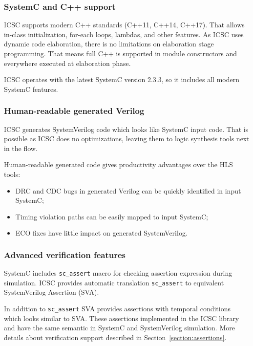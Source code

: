 \subsubsection{SystemC and C++ support}

ICSC supports modern C++ standards (C++11, C++14, C++17). That allows in-class initialization, for-each loops, lambdas, and other features.
As ICSC uses dynamic code elaboration, there is no limitations on elaboration stage programming. That means full C++ is supported in module constructors and everywhere executed at elaboration phase.

ICSC operates with the latest SystemC version 2.3.3, so it includes all modern SystemC features. 

\subsubsection{Human-readable generated Verilog}

ICSC generates SystemVerilog code which looks like SystemC input code. That is possible as ICSC does no optimizations, leaving them to logic synthesis tools next in the flow.

Human-readable generated code gives productivity advantages over the HLS tools:
\begin{itemize}
\item DRC and CDC bugs in generated Verilog can be quickly identified in input SystemC;
\item Timing violation paths can be easily mapped to input SystemC;
\item ECO fixes have little impact on generated SystemVerilog.
\end{itemize}

\subsubsection{Advanced verification features}

SystemC includes {\tt sc\_assert} macro for checking assertion expression during simulation. ICSC provides automatic translation {\tt sc\_assert} to equivalent SystemVerilog Assertion (SVA).

In addition to {\tt sc\_assert} SVA provides assertions with temporal conditions which looks similar to SVA. These assertions implemented in the ICSC library and have the same semantic in SystemC and SystemVerilog simulation. More details about verification support described in Section~\ref{section:assertions}.

